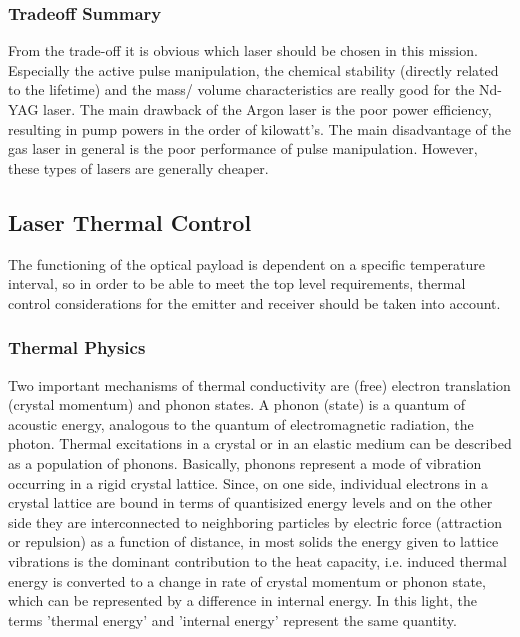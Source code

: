 	\subsubsection{Tradeoff Summary}
From the trade-off it is obvious which \acs{laser} should be chosen in this mission. Especially the active pulse manipulation, the chemical stability (directly related to the lifetime) and the mass/ volume characteristics are really good for the Nd-YAG \acs{laser}. The main drawback of the Argon \acs{laser} is the poor power efficiency, resulting in pump powers in the order of kilowatt's. The main disadvantage of the gas \acs{laser} in general is the poor performance of pulse manipulation. However, these types of \acs{laser}s are generally cheaper. 
	
	\subsection{Laser Thermal Control}
	\label{mtLSRthermal}
\cite{lasertech}The functioning of the optical payload is dependent on a specific temperature interval, so in order to be able to meet the top level requirements, thermal control considerations for the emitter and receiver should be taken into account. 

\subsubsection{Thermal Physics}
	\label{mtLSRthermalphysics}
Two important mechanisms of thermal conductivity are (free) electron translation (crystal momentum) and phonon states. A phonon (state) is a quantum of acoustic energy, analogous to the quantum of electromagnetic radiation, the photon. Thermal excitations in a crystal or in an elastic medium can be described as a population of phonons. Basically, phonons represent a mode of vibration occurring in a rigid crystal lattice. Since, on one side, individual electrons in a crystal lattice are bound in terms of quantisized energy levels and on the other side they are interconnected to neighboring particles by electric force (attraction or repulsion) as a function of distance, in most solids the energy given to lattice vibrations is the dominant contribution to the heat capacity, i.e. induced thermal energy is converted to a change in rate of crystal momentum or phonon state, which can be represented by a difference in internal energy. In this light, the terms 'thermal energy' and 'internal energy' represent the same quantity. 

